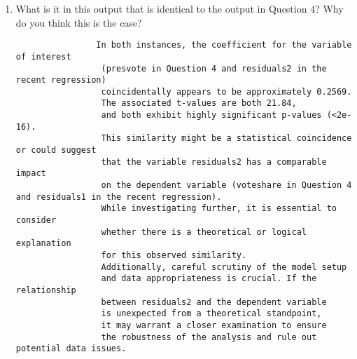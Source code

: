 \documentclass[12pt,letterpaper]{article}
\begin{document}
\begin{enumerate}
		\item What is it in this output that is identical to the output in Question 4? Why do you think this is the case?
		\begin{footnotesize}
			\begin{verbatim}
				In both instances, the coefficient for the variable of interest
				 (presvote in Question 4 and residuals2 in the recent regression) 
				 coincidentally appears to be approximately 0.2569. 
				 The associated t-values are both 21.84, 
				 and both exhibit highly significant p-values (<2e-16).
				 This similarity might be a statistical coincidence or could suggest 
				 that the variable residuals2 has a comparable impact 
				 on the dependent variable (voteshare in Question 4 and residuals1 in the recent regression).
				 While investigating further, it is essential to consider
				 whether there is a theoretical or logical explanation 
				 for this observed similarity. 
				 Additionally, careful scrutiny of the model setup 
				 and data appropriateness is crucial. If the relationship 
				 between residuals2 and the dependent variable 
				 is unexpected from a theoretical standpoint, 
				 it may warrant a closer examination to ensure 
				 the robustness of the analysis and rule out potential data issues.
			\end{verbatim}
	     \end{footnotesize}
		\vspace{.15cm}
		\noindent
		\vspace{.15cm}
		
	\end{enumerate}
\end{document}
